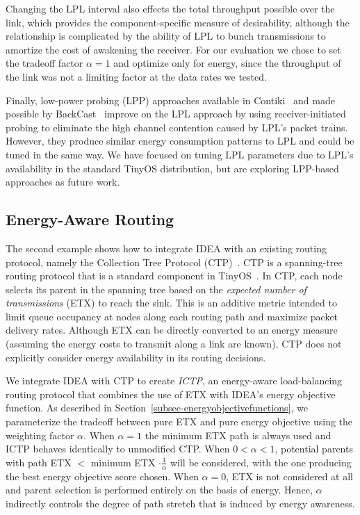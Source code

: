 Changing the LPL interval also effects the total throughput possible over the
link, which provides the component-specific measure of desirability, although
the relationship is complicated by the ability of LPL to bunch transmissions
to amortize the cost of awakening the receiver. For our evaluation we chose
to set the tradeoff factor $\alpha=1$ and optimize only for energy, since the
throughput of the link was not a limiting factor at the data rates we tested.

Finally, low-power probing (LPP) approaches available in
Contiki~\cite{contiki} and made possible by BackCast~\cite{backcast-hotnets}
improve on the LPL approach by using receiver-initiated probing to eliminate
the high channel contention caused by LPL's packet trains. However, they
produce similar energy consumption patterns to LPL and could be tuned in the
same way. We have focused on tuning LPL parameters due to LPL's availability
in the standard TinyOS distribution, but are exploring LPP-based approaches
as future work.

\subsection{Energy-Aware Routing}
\label{subsec-ictpcasestudy}

The second example shows how to integrate IDEA with an existing routing
protocol, namely the Collection Tree Protocol (CTP)~\cite{ctp-sensys09}. CTP
is a spanning-tree routing protocol that is a standard component in
TinyOS~\cite{tinyos-asplos00}. In CTP, each node selects its parent in the
spanning tree based on the \textit{expected number of transmissions} (ETX) to
reach the sink. This is an additive metric intended to limit queue occupancy
at nodes along each routing path and maximize packet delivery rates. Although
ETX can be directly converted to an energy measure (assuming the energy costs
to transmit along a link are known), CTP does not explicitly consider energy
availability in its routing decisions.

We integrate IDEA with CTP to create \textit{ICTP}, an energy-aware
load-balancing routing protocol that combines the use of ETX with IDEA's
energy objective function. As described in
Section~\ref{subsec-energyobjectivefunctions}, we parameterize the tradeoff
between pure ETX and pure energy objective using the weighting factor
$\alpha$. When $\alpha = 1$ the minimum ETX path is always used and ICTP
behaves identically to unmodified CTP. When $0 < \alpha < 1$, potential
parents with path ETX $<$ minimum ETX $\cdot \frac{1}{\alpha}$ will be
considered, with the one producing the best energy objective score chosen.
When $\alpha = 0$, ETX is not considered at all and parent selection is
performed entirely on the basis of energy. Hence, $\alpha$ indirectly
controls the degree of path stretch that is induced by energy awareness. 

